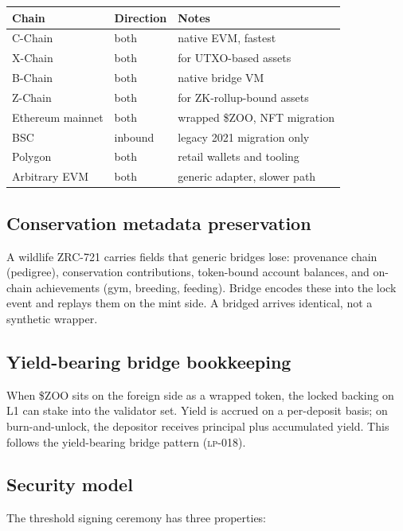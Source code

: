 \begin{longtable}{p{}p{}p{}}
\toprule
\textbf{Chain} & \textbf{Direction} & \textbf{Notes} \\
\midrule
\Lux{} C-Chain & both & native EVM, fastest \\
\Lux{} X-Chain & both & for UTXO-based assets \\
\Lux{} B-Chain & both & native bridge VM \\
\Lux{} Z-Chain & both & for ZK-rollup-bound assets \\
Ethereum mainnet & both & wrapped \$ZOO, NFT migration \\
BSC & inbound & legacy 2021 \Zoo{} migration only \\
Polygon & both & retail wallets and tooling \\
Arbitrary EVM & both & generic adapter, slower path \\
\bottomrule
\end{longtable}

\subsection{Conservation metadata preservation}

A wildlife ZRC-721 carries fields that generic bridges lose: provenance
chain (pedigree), conservation contributions, token-bound account
balances, and on-chain achievements (gym, breeding, feeding). \Zoo{}
Bridge encodes these into the lock event and replays them on the
mint side. A bridged \NFT{} arrives identical, not a synthetic
wrapper.

\subsection{Yield-bearing bridge bookkeeping}

When \$ZOO sits on the foreign side as a wrapped token, the locked
backing on \Zoo{} L1 can stake into the validator set. Yield is
accrued on a per-deposit basis; on burn-and-unlock, the depositor
receives principal plus accumulated yield. This follows the
yield-bearing bridge pattern (\textsc{lp-018}).

\subsection{Security model}

The threshold signing ceremony has three properties:

